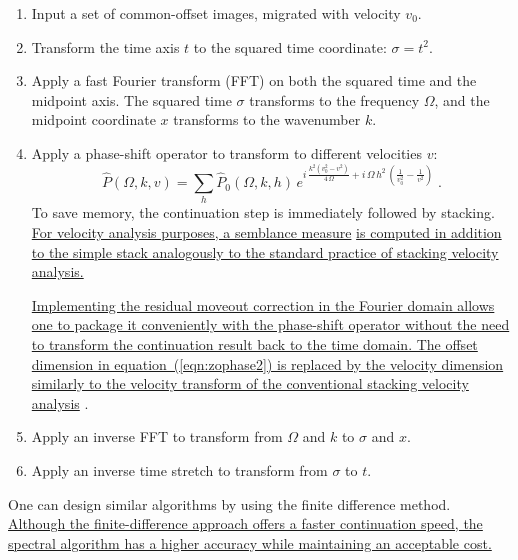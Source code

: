 \begin{enumerate}
  \item Input a set of common-offset images, migrated with velocity $v_0$.
  \item Transform the time axis $t$ to the squared time coordinate:
    $\sigma=t^2$.
  \item Apply a fast Fourier transform (FFT) on both the squared time
    and the midpoint axis. The squared time $\sigma$ transforms to the
    frequency $\Omega$, and the midpoint coordinate $x$ transforms to
    the wavenumber $k$. 
  \item Apply a phase-shift operator to transform to different velocities $v$:
    \begin{equation}
      \label{eqn:zophase2}
      \hat{P}(\Omega,k,v) = \sum_{h} \hat{P}_0 (\Omega,k,h)\,
      e^{i\,\frac{k^2\left(v_0^2 - v^2\right)}{4\,\Omega} +
        i\,\Omega\,h^2\, \left(\frac{1}{v_0^2} -
          \frac{1}{v^2}\right)}\;.
    \end{equation}
    To save memory, the continuation step is immediately followed
    by stacking. \uline{For velocity analysis purposes, a semblance measure}
    \cite{GEO36-03-04820497} \uline{is computed in addition to the simple stack
    analogously to the standard practice of stacking velocity analysis.}
    
    \uline{Implementing the residual moveout correction in the Fourier domain allows
    one to package it conveniently with the phase-shift operator without the
    need to transform the continuation result back to the time domain. The
    offset dimension in equation~(\ref{eqn:zophase2}) is replaced by the
    velocity dimension similarly to the velocity transform of the conventional
    stacking velocity analysis} \cite{IG202-00-10012027}.

  \item Apply an inverse FFT to transform from $\Omega$ and $k$ to
    $\sigma$ and $x$.
  \item Apply an inverse time stretch to transform from $\sigma$ to $t$.
  \end{enumerate}  
  One can design similar algorithms by using the finite difference method.
  \uline{Although the finite-difference approach offers a faster continuation speed,
  the spectral algorithm has a higher accuracy while maintaining an acceptable
  cost.}


